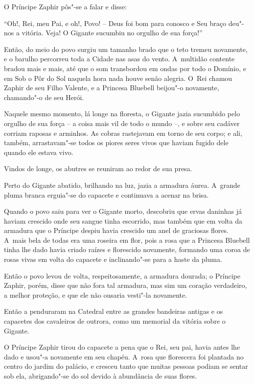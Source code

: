 O Príncipe Zaphir pôs"-se a falar e disse:

``Oh!, Rei, meu Pai, e oh!, Povo! -- Deus foi bom para conosco e Seu
braço deu"-nos a vitória. Veja! O Gigante sucumbiu no orgulho de sua
força!''

Então, do meio do povo surgiu um tamanho brado que o teto tremeu
novamente, e o barulho percorreu toda a Cidade nas asas do vento. A~multidão contente bradou mais e mais, até que o som transbordou em ondas
por todo o Domínio, e em Sob o Pôr do Sol naquela hora nada houve senão
alegria. O~Rei chamou Zaphir de seu Filho Valente, e a Princesa Bluebell
beijou"-o novamente, chamando"-o de seu Herói.

Naquele mesmo momento, lá longe na floresta, o Gigante jazia sucumbido
pelo orgulho de sua força -- a coisa mais vil de todo o mundo --, e
sobre seu cadáver corriam raposas e arminhos. As cobras rastejavam em
torno de seu corpo; e ali, também, arrastavam"-se todos os piores seres
vivos que haviam fugido dele quando ele estava vivo.

Vindos de longe, os abutres se reuniram ao redor de sua presa.

Perto do Gigante abatido, brilhando na luz, jazia a armadura áurea. A~grande pluma branca erguia"-se do capacete e continuava a acenar na
brisa.

Quando o povo saiu para ver o Gigante morto, descobriu que ervas
daninhas já haviam crescido onde seu sangue tinha escorrido, mas também
que em volta da armadura que o Príncipe despiu havia crescido um anel de
graciosas flores. A~mais bela de todas era uma roseira em
flor, pois a rosa que a Princesa Bluebell tinha lhe dado havia criado
raízes e florescido novamente, formando uma coroa de rosas vivas em
volta do capacete e inclinando"-se para a haste da pluma.

Então o povo levou de volta, respeitosamente, a armadura dourada; o
Príncipe Zaphir, porém, disse que não fora tal armadura, mas sim um
coração verdadeiro, a melhor proteção, e que ele não ousaria vesti"-la
novamente.

Então a penduraram na Catedral entre as grandes bandeiras antigas e os
capacetes dos cavaleiros de outrora, como um memorial da vitória sobre o
Gigante.

O Príncipe Zaphir tirou do capacete a pena que o Rei, seu pai, havia
antes lhe dado e usou"-a novamente em seu chapéu. A~rosa que florescera
foi plantada no centro do jardim do palácio, e cresceu tanto que muitas
pessoas podiam se sentar sob ela, abrigando"-se do sol devido à abundância de
suas flores.


